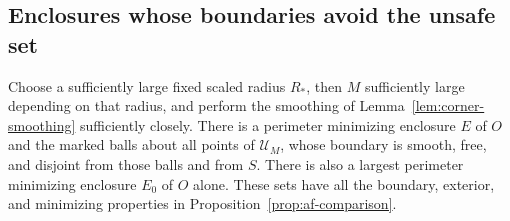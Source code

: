 \subsection{Enclosures whose boundaries avoid the unsafe set}

\begin{lemma}
\label{lem:free-enclosure}
Choose a sufficiently large fixed scaled radius \(R_*\), then
\(M\) sufficiently large depending on that radius, and perform
the smoothing of Lemma~\ref{lem:corner-smoothing} sufficiently
closely.  There is a perimeter minimizing enclosure \(E\) of
\(O\) and the marked balls about all points of \(\mathcal U_M\),
whose boundary is smooth, free, and disjoint from those balls and
from \(S\).  There is also a largest perimeter minimizing
enclosure \(E_0\) of \(O\) alone.  These sets have all the
boundary, exterior, and minimizing properties in
Proposition~\ref{prop:af-comparison}.
\end{lemma}

